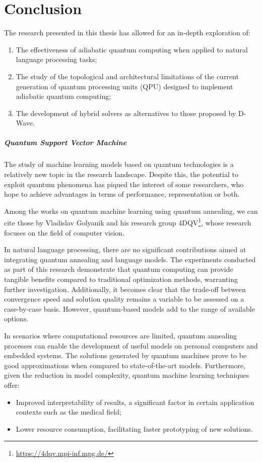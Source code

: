 \chapter{Conclusion}

The research presented in this thesis has allowed for an in-depth exploration of:
\begin{enumerate}
    \item The effectiveness of adiabatic quantum computing when applied to natural language processing tasks;
    \item The study of the topological and architectural limitations of the current generation of quantum processing units (QPU) designed to implement adiabatic quantum computing;
    \item The development of hybrid solvers as alternatives to those proposed by D-Wave.
\end{enumerate}

\paragraph{Quantum Support Vector Machine} The study of machine learning models based on quantum technologies is a relatively new topic in the research landscape. 
Despite this, the potential to exploit quantum phenomena has piqued the interest of some researchers, who hope to achieve advantages in terms of performance, representation or both.

Among the works on quantum machine learning using quantum annealing, we can cite those by Vladislav Golyanik and his research group 4DQV\footnote{\url{https://4dqv.mpi-inf.mpg.de/}}, whose research focuses on the field of computer vision\cite{qcv1}\cite{qcv2}.

In natural language processing, there are no significant contributions aimed at integrating quantum annealing and language models. 
The experiments conducted as part of this research demonstrate that quantum computing can provide tangible benefits compared to traditional optimization methods, warranting further investigation. 
Additionally, it becomes clear that the trade-off between convergence speed and solution quality remains a variable to be assessed on a case-by-case basis. 
However, quantum-based models add to the range of available options.

In scenarios where computational resources are limited, quantum annealing processes can enable the development of useful models on personal computers and embedded systems. 
The solutions generated by quantum machines prove to be good approximations when compared to state-of-the-art models. 
Furthermore, given the reduction in model complexity, quantum machine learning techniques offer:
\begin{itemize}
    \item Improved interpretability of results, a significant factor in certain application contexts such as the medical field;
    \item Lower resource consumption, facilitating faster prototyping of new solutions.
\end{itemize}

